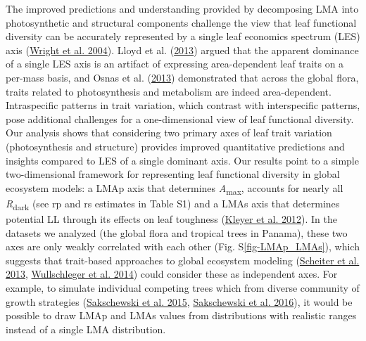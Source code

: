 \documentclass[
  12pt,
  a4paper,
,tablecaptionabove
]{scrartcl}
\begin{document}
The improved predictions and understanding provided by decomposing LMA
into photosynthetic and structural components challenge the view that
leaf functional diversity can be accurately represented by a single leaf
economics spectrum (LES) axis
(\protect\hyperlink{ref-Wright2004a}{Wright et al. 2004}). Lloyd et al.
(\protect\hyperlink{ref-Lloyd2013}{2013}) argued that the apparent
dominance of a single LES axis is an artifact of expressing
area-dependent leaf traits on a per-mass basis, and Osnas et al.
(\protect\hyperlink{ref-Osnas2013}{2013}) demonstrated that across the
global flora, traits related to photosynthesis and metabolism are indeed
area-dependent. Intraspecific patterns in trait variation, which
contrast with interspecific patterns, pose additional challenges for a
one-dimensional view of leaf functional diversity. Our analysis shows
that considering two primary axes of leaf trait variation
(photosynthesis and structure) provides improved quantitative
predictions and insights compared to LES of a single dominant axis. Our
results point to a simple two-dimensional framework for representing
leaf functional diversity in global ecosystem models: a LMAp axis that
determines \emph{A}\textsubscript{max}, accounts for nearly all
\emph{R}\textsubscript{dark} (see rp and rs estimates in Table S1) and a
LMAs axis that determines potential LL through its effects on leaf
toughness (\protect\hyperlink{ref-Kleyer2012}{Kleyer et al. 2012}). In
the datasets we analyzed (the global flora and tropical trees in
Panama), these two axes are only weakly correlated with each other (Fig.
S\ref{fig-LMAp_LMAs}), which suggests that trait-based approaches to
global ecosystem modeling (\protect\hyperlink{ref-Scheiter2013}{Scheiter
et al. 2013}, \protect\hyperlink{ref-Wullschleger2014}{Wullschleger et
al. 2014}) could consider these as independent axes. For example, to
simulate individual competing trees which from diverse community of
growth strategies (\protect\hyperlink{ref-Sakschewski2015}{Sakschewski
et al. 2015}, \protect\hyperlink{ref-Sakschewski2016}{Sakschewski et al.
2016}), it would be possible to draw LMAp and LMAs values from
distributions with realistic ranges instead of a single LMA
distribution.
\end{document}
